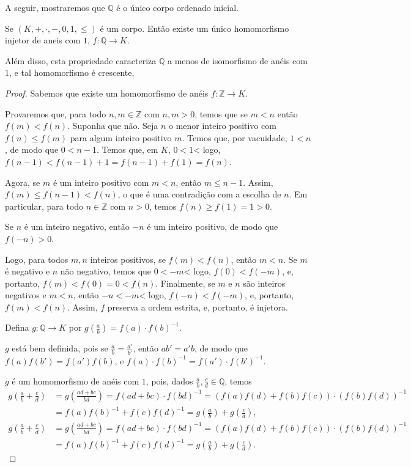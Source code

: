 A seguir, mostraremos que $\mathbb Q$ é o único corpo ordenado inicial.
\begin{theorem}
    Se $(K, +, \cdot, -, 0, 1, \leq)$ é um corpo.
    Então existe um único homomorfismo injetor de aneis com $1$, $f:\mathbb Q\to K$.

    Além disso, esta propriedade caracteriza $\mathbb Q$ a menos de isomorfismo de anéis com $1$, e tal homomorfismo é crescente,
\end{theorem}
\begin{proof}
    Sabemos que existe um homomorfismo de anéis $f:\mathbb Z\to K$.
    
    Provaremos que, para todo $n, m \in \mathbb Z$ com $n, m>0$, temos que se $m<n$ então $f(m)<f(n)$.
    Suponha que não.
    Seja $n$ o menor inteiro positivo com $f(n)\leq f(m)$ para algum inteiro positivo $m$.
    Temos que, por vacuidade, $1<n$, de modo que $0<n-1$.
    Temos que, em $K$, $0< 1$< logo, $f(n-1)< f(n-1)+1=f(n-1)+f(1)=f(n)$.
    
    Agora, se $m$ é um inteiro positivo com $m<n$, então $m\leq n-1$.
    Assim, $f(m)\leq f(n-1)< f(n)$, o que é uma contradição com a escolha de $n$.
    Em particular, para todo $n\in\mathbb Z$ com $n>0$, temos $f(n)\geq f(1)=1>0$.

     Se $n$ é um inteiro negativo, então $-n$ é um inteiro positivo, de modo que $f(-n)>0$.

    Logo, para todos $m, n$ inteiros positivos, se $f(m)<f(n)$, então $m<n$.
    Se $m$ é negativo e $n$ não negativo, temos que $0<-m$< logo, $f(0)<f(-m)$, e, portanto, $f(m)<f(0)=0<f(n)$.
    Finalmente, se $m$ e $n$ são inteiros negativos e $m<n$, então $-n<-m$< logo, $f(-n)<f(-m)$, e, portanto, $f(m)<f(n)$.
    Assim, $f$ preserva a ordem estrita, e, portanto, é injetora.

    Defina $g:\mathbb Q\to K$ por $g\left(\frac{a}{b}\right) = f(a)\cdot f(b)^{-1}$.
    
    $g$ está bem definida, pois se $\frac{a}{b}=\frac{a'}{b'}$, então $ab'=a'b$, de modo que $f(a)f(b')=f(a')f(b)$, e $f(a)\cdot f(b)^{-1} = f(a')\cdot f(b')^{-1}$.

    $g$ é um homomorfismo de anéis com $1$, pois, dados $\frac{a}{b}, \frac{c}{d}\in\mathbb Q$, temos
    \begin{align*}
         g\left(\frac{a}{b}+\frac{c}{d}\right) &= g\left(\frac{ad+bc}{bd}\right) = f(ad+bc)\cdot f(bd)^{-1} = (f(a)f(d)+f(b)f(c))\cdot (f(b)f(d))^{-1}\\
         &= f(a)f(b)^{-1}+f(c)f(d)^{-1} = g\left(\frac{a}{b}\right)+g\left(\frac{c}{d}\right),
    \end{align*}
    \begin{align*}
         g\left(\frac{a}{b}+\frac{c}{d}\right) &= g\left(\frac{ad+bc}{bd}\right) = f(ad+bc)\cdot f(bd)^{-1} = (f(a)f(d)+f(b)f(c))\cdot (f(b)f(d))^{-1}\\
         &= f(a)f(b)^{-1}+f(c)f(d)^{-1} = g\left(\frac{a}{b}\right)+g\left(\frac{c}{d}\right).
    \end{align*}


\end{proof}
